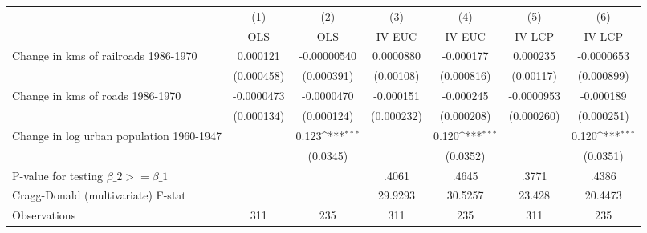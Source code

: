 {
\def\sym#1{\ifmmode^{#1}\else\(^{#1}\)\fi}
\begin{tabular}{l*{6}{c}}
\hline\hline
                &\multicolumn{1}{c}{(1)}&\multicolumn{1}{c}{(2)}&\multicolumn{1}{c}{(3)}&\multicolumn{1}{c}{(4)}&\multicolumn{1}{c}{(5)}&\multicolumn{1}{c}{(6)}\\
                &\multicolumn{1}{c}{OLS}&\multicolumn{1}{c}{OLS}&\multicolumn{1}{c}{IV EUC}&\multicolumn{1}{c}{IV EUC}&\multicolumn{1}{c}{IV LCP}&\multicolumn{1}{c}{IV LCP}\\
\hline
Change in kms of railroads 1986-1970& 0.000121         &-0.00000540         &0.0000880         &-0.000177         & 0.000235         &-0.0000653         \\
                &(0.000458)         &(0.000391)         &(0.00108)         &(0.000816)         &(0.00117)         &(0.000899)         \\
[1em]
Change in kms of roads 1986-1970&-0.0000473         &-0.0000470         &-0.000151         &-0.000245         &-0.0000953         &-0.000189         \\
                &(0.000134)         &(0.000124)         &(0.000232)         &(0.000208)         &(0.000260)         &(0.000251)         \\
[1em]
Change in log urban population 1960-1947&                  &    0.123\sym{***}&                  &    0.120\sym{***}&                  &    0.120\sym{***}\\
                &                  & (0.0345)         &                  & (0.0352)         &                  & (0.0351)         \\
\hline
P-value for testing $\beta\_{2} >= \beta\_{1}$&                  &                  &    .4061         &    .4645         &    .3771         &    .4386         \\
Cragg-Donald (multivariate) F-stat&                  &                  &  29.9293         &  30.5257         &   23.428         &  20.4473         \\
Observations    &      311         &      235         &      311         &      235         &      311         &      235         \\
\hline\hline
\end{tabular}
}
